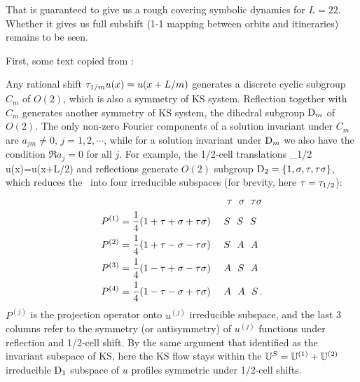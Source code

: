 \begin{description}
That is guaranteed to give us a rough covering symbolic dynamics for
$L=22$. Whether it gives us full subshift (1-1 mapping between orbits and
itineraries) remains to be seen.

First, some text copied from :

Any rational shift $ \tau_{1/m}u(x)=u(x+L/m)$ generates a discrete
cyclic subgroup $C_m$ of $O(2)$, which is also a symmetry of KS
system. Reflection together with $C_m$ generates another
symmetry of KS system, the dihedral subgroup $\textrm{D}_{m}$ of $O(2)$.
The only non-zero Fourier components of a solution invariant
under $C_m$ are $a_{jm} \neq 0$, $j =1,2,\cdots$, while for a
solution invariant under $\textrm{D}_{m}$ we also have the condition
$\Re a_j=0$ for all $j$.
For example, the 1/2-cell translations \beq
    \Shift_{1/2}\, u(x)=u(x+L/2)
and reflections generate $O(2)$
subgroup $\Dn{2} = \{1, \Refl,\Shift,\Shift\Refl\}$,
which
reduces the \statesp\ into four irreducible subspaces
(for brevity, here $\Shift = \Shift_{1/2}$):
\begin{align}
 & \qquad\qquad\qquad\qquad\qquad
              ~~~ \Shift ~~ \Refl  ~\;  \Shift\Refl
    \nnu\\
P^{(1)} &= \frac{1}{4} (1 + \Shift + \Refl + \Shift\Refl)
           ~~~~  S  ~~  S   ~~   S
    \nnu\\
P^{(2)} &= \frac{1}{4} (1 + \Shift - \Refl - \Shift\Refl)
            ~~~~  S  ~~  A   ~~   A
    \nnu\\
P^{(3)} &= \frac{1}{4} (1 - \Shift + \Refl - \Shift\Refl)
           ~~~~  A  ~~  S   ~~   A
     \label{ek_defn1}\\
P^{(4)} &= \frac{1}{4} (1 - \Shift - \Refl + \Shift\Refl)
          ~~~~  A  ~~  A   ~~   S
\,.
    \nnu
\end{align}
$P^{(j)}$ is the projection operator onto
$u^{(j)}$ irreducible subspace, and the last 3 columns
refer to the symmetry (or antisymmetry) of
$u^{(j)}$ functions under reflection and
1/2-cell shift.
By the same argument that identified  as
the invariant subspace of KS, here the KS flow
stays within the
 $\mathbb{U}^S =  \mathbb{U}^{(1)}+ \mathbb{U}^{(2)}$
irreducible $\textrm{D}_{1}$ subspace of
$u$ profiles symmetric under 1/2-cell shifts.


\end{description}
